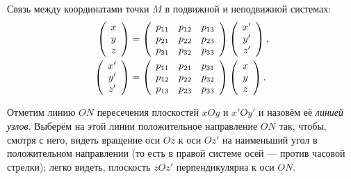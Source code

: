 Связь между координатами точки $M$ в подвижной и неподвижной системах:
\begin{equation}
  \label{eq:coords_transform}
  \begin{aligned}
    \left(
    \begin{array}{c}
      x \\
      y \\
      z \\
    \end{array}
    \right)
    &=
    \left(
    \begin{array}{c c c}
      p_{11} & p_{12} & p_{13} \\
      p_{21} & p_{22} & p_{23} \\
      p_{31} & p_{32} & p_{33}
    \end{array}
    \right)
    \left(
    \begin{array}{c}
      x' \\
      y' \\
      z' \\
    \end{array}
    \right), \\
    \left(
    \begin{array}{c}
      x' \\
      y' \\
      z' \\
    \end{array}
    \right)
    &=
    \left(
    \begin{array}{c c c}
      p_{11} & p_{21} & p_{31} \\
      p_{12} & p_{22} & p_{32} \\
      p_{13} & p_{23} & p_{33}
    \end{array}
    \right)
    \left(
    \begin{array}{c}
      x \\
      y \\
      z \\
    \end{array}
    \right).
  \end{aligned}
\end{equation}

Отметим линию $ON$ пересечения плоскостей $xOy$ и $x'Oy'$ и назовём её
\textit{линией узлов}. Выберём на этой линии положительное направление $ON$ так,
чтобы, смотря с него, видеть вращение оси $Oz$ к оси $Oz'$ на наименьший угол в
положительном направлении (то есть в правой системе осей --- против часовой
стрелки); легко видеть, плоскость $zOz'$ перпендикулярна к оси $ON$.


